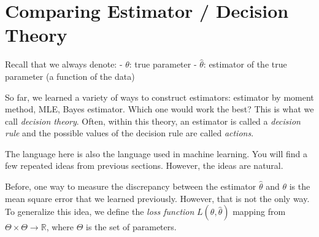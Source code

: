 \documentclass[
  openany]{book}
\theoremstyle{definition}
\theoremstyle{definition}
\theoremstyle{definition}
\theoremstyle{definition}
\theoremstyle{remark}
\begin{document}
\hypertarget{comparing-estimator-decision-theory}{%
\section{Comparing Estimator / Decision Theory}\label{comparing-estimator-decision-theory}}

Recall that we always denote:
- \(\theta\): true parameter
- \(\hat \theta\): estimator of the true parameter (a function of the data)

So far, we learned a variety of ways to construct estimators: estimator by moment method, MLE, Bayes estimator.
Which one would work the best? This is what we call \emph{decision theory}.
Often, within this theory, an estimator is called a \emph{decision rule} and the possible values of the decision rule are called \emph{actions}.

The language here is also the language used in machine learning. You will find a few repeated ideas from previous sections.
However, the ideas are natural.

Before, one way to measure the discrepancy between the estimator \(\hat \theta\) and \(\theta\) is
the mean square error that we learned previously.
However, that is not the only way.
To generalize this idea, we define the \emph{loss function} \(L(\theta, \hat \theta)\) mapping from
\(\Theta\times \Theta \to \mathbb{R}\), where \(\Theta\) is the set of parameters.
\end{document}
